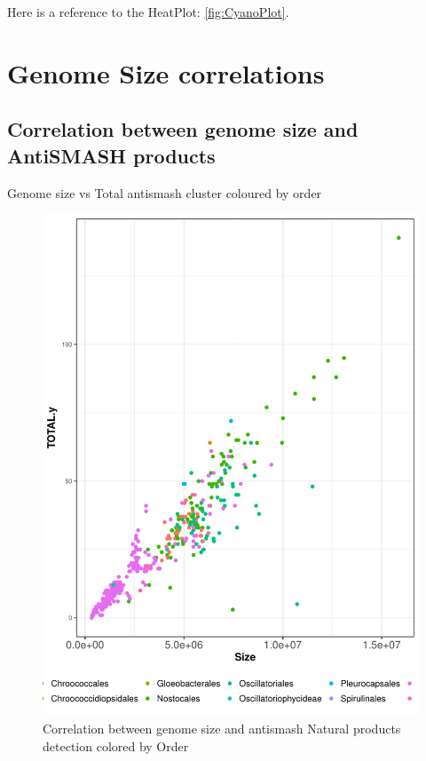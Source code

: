 \documentclass[12pt,twoside]{reedthesis}
\begin{document}
  Here is a reference to the HeatPlot: \autoref{fig:CyanoPlot}.
  \clearpage 
  
  \section{Genome Size correlations}\label{genome-size-correlations-2}
  
  \subsection{Correlation between genome size and AntiSMASH
  products}\label{correlation-between-genome-size-and-antismash-products-2}
  
  Genome size vs Total antismash cluster coloured by order
  
  \begin{figure}[h!tbp]
  \centering
  \includegraphics[angle = 0,scale = 0.6]{chapter5/SMASHvsSizebyOrder.pdf}
  \caption[Correlation between genome size and antismash Natural products detection colored by Order]{\normalsize{Correlation between genome size and antismash Natural products detection colored by Order}}
  \label{fig:SMASHvsSizebyOrder}
  \end{figure}
  
\end{document}

